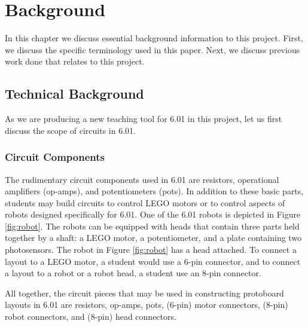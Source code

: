 
\chapter{Background}
\label{ch:background}

In this chapter we discuss essential background information to this project.
First, we discuss the specific terminology used in this paper. Next, we discuss
previous work done that relates to this project.

\section{Technical Background}

As we are producing a new teaching tool for 6.01 in this project,
let us first discuss the scope of circuits in 6.01.

\subsection{Circuit Components}

The rudimentary circuit components used in 6.01 are resistors, operational
amplifiers (op-amps), and potentiometers (pots). In addition to these basic
parts, students may build circuits to control LEGO motors or to control
aspects of robots designed specifically for 6.01. One of the 6.01 robots is
depicted in Figure \ref{fig:robot}. The robots can be equipped with heads that
contain three parts held together by a shaft: a LEGO motor, a potentiometer, and
a plate containing two photosensors. The robot in Figure \ref{fig:robot} has a
head attached. To connect a layout to a LEGO motor, a student would use a 6-pin
connector, and to connect a layout to a robot or a robot head, a student
use an 8-pin connector.

All together, the circuit pieces that may be used in constructing protoboard
layouts in 6.01 are resistors, op-amps, pots, (6-pin) motor connectors, (8-pin)
robot connectors, and (8-pin) head connectors.

